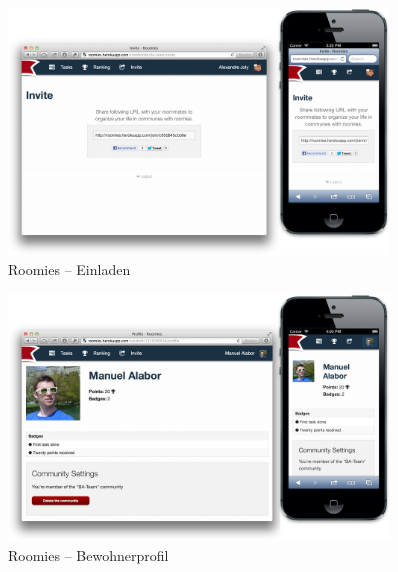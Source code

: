 \begin{figure}[H]
	\centering
	\includegraphics[width=0.9\textwidth]{content/appendix/roomies-screenshots/invite.png}
	\caption{Roomies -- Einladen}
	\label{fig:roomies-ss-invite}
\end{figure}

\begin{figure}[H]
	\centering
	\includegraphics[width=0.9\textwidth]{content/appendix/roomies-screenshots/profile.png}
	\caption{Roomies -- Bewohnerprofil}
	\label{fig:roomies-ss-profile}
\end{figure}
